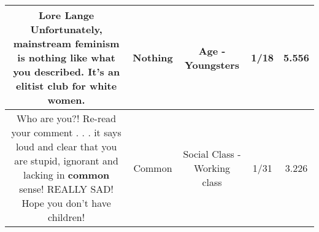 \documentclass[11pt]{article}
\newlength\mylength
\begin{document}
\begin{center}
\begin{longtable}{|C{.65\mylength}|C{.30\mylength}|C{.12\mylength}|C{.12\mylength}|C{.12\mylength}|}
  \small Lore Lange Unfortunately, mainstream feminism is \textbf{nothing} like what you described. It's an elitist club for white women.\normalsize   & Nothing & Age - Youngsters & 1/18 & 5.556 \\  \hline
  \small Who are you?!  Re-read your comment  . . . it says loud and clear that you are stupid, ignorant and lacking in \textbf{common} sense!  REALLY SAD!  Hope you don't have children!\normalsize   & Common & Social Class - Working class & 1/31 & 3.226 \\  \hline
  
\end{longtable}
\end{center}
\end{document}
